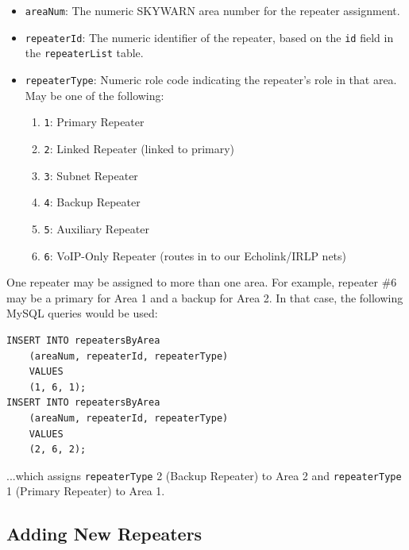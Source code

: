 \documentclass[pdflatex,letterpaper,twoside,12pt]{book}
\begin{document}
\begin{itemize}
\item \texttt{areaNum}:  The numeric SKYWARN area number for the repeater assignment.
\item \texttt{repeaterId}:  The numeric identifier of the repeater, based on the \texttt{id} field in the \texttt{repeaterList} table.
\item \texttt{repeaterType}: Numeric role code indicating the repeater's role in that area. May be one of the following:
	\begin{enumerate}
	\item \texttt{1}: Primary Repeater
	\item \texttt{2}: Linked Repeater (linked to primary)
	\item \texttt{3}: Subnet Repeater
	\item \texttt{4}: Backup Repeater
	\item \texttt{5}: Auxiliary Repeater
	\item \texttt{6}: VoIP-Only Repeater (routes in to our Echolink/IRLP nets)
	\end{enumerate}
\end{itemize}

One repeater may be assigned to more than one area.  For example, repeater \#6 may be a primary for Area 1 and a backup for Area 2.  In that case, the following MySQL queries would be used:

\begin{verbatim}
INSERT INTO repeatersByArea
	(areaNum, repeaterId, repeaterType)
	VALUES
	(1, 6, 1);
INSERT INTO repeatersByArea
	(areaNum, repeaterId, repeaterType)
	VALUES
	(2, 6, 2);
\end{verbatim}

...which assigns \texttt{repeaterType} 2 (Backup Repeater) to Area 2 and \texttt{repeaterType} 1 (Primary Repeater) to Area 1.


\subsection{Adding New Repeaters}
\end{document}
